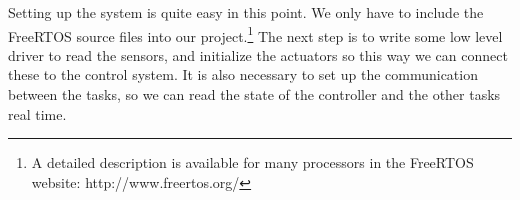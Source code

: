 Setting up the system is quite easy in this point. We only have to include the FreeRTOS source files into our project.\footnote{A detailed description is available for many processors in the FreeRTOS website: http://www.freertos.org/} The next step is to write some low level driver to read the sensors, and initialize the actuators so this way we can connect these to the control system. It is also necessary to set up the communication between the tasks, so we can read the state of the controller and the other tasks real time.
